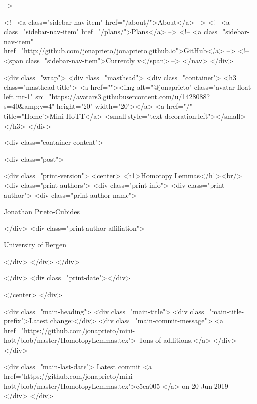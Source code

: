       
     -->

    <!-- <a class="sidebar-nav-item" href="/about/">About</a> -->
    <!-- <a class="sidebar-nav-item" href="/plans/">Plans</a> -->
    <!-- <a class="sidebar-nav-item" href="http://github.com/jonaprieto/jonaprieto.github.io">GitHub</a> -->
    <!-- <span class="sidebar-nav-item">Currently v</span> -->
  </nav>
</div>

    <div class="wrap">
      <div class="masthead">
        <div class="container">
          <h3 class="masthead-title">
            <a href=""><img alt="@jonaprieto" class="avatar float-left mr-1" src="https://avatars3.githubusercontent.com/u/1428088?s=40&amp;v=4" height="20" width="20"></a>
            <a href="/" title="Home">Mini-HoTT</a>
            <small style="text-decoration:left"></small>
          </h3>
        </div>
      
      <div class="container content">
        







<div class="post">

  <div class="print-version">
    <center>
      <h1>Homotopy Lemmas</h1><br/>
        <div class="print-authors">
          <div class="print-info">
            <div class="print-author">
              <div class="print-author-name">
                
                  Jonathan Prieto-Cubides
                
              </div>
              <div class="print-author-affiliation">
                
                  University of Bergen
                
                </div>
            </div>
          </div>
          
          
        </div>
        <div class="print-date"></div>
        
        
    </center>
  </div>

  
  <div class="main-heading">
    <div class="main-title">
      <div class="main-title-prefix">Latest change:</div>
      <div class="main-commit-message">
            <a href="https://github.com/jonaprieto/mini-hott/blob/master/HomotopyLemmas.tex">
              Tons of additions.</a>
      </div>
    </div>

    <div class="main-last-date">
      Latest commit <a href="https://github.com/jonaprieto/mini-hott/blob/master/HomotopyLemmas.tex">e5ca005 </a> on  20 Jun 2019
    </div>
  </div>
  
